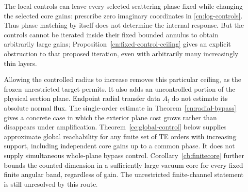 \begin{remark}
\label{cn:global-attempt}
The local controls can leave every selected scattering phase fixed
while changing the selected core gains: prescribe zero imaginary
coordinates in \eqref{cn:log-controls}.  Thus phase matching by itself
does not determine the internal response.  But the controls cannot
be iterated inside their fixed bounded annulus to obtain arbitrarily
large gains; Proposition~\ref{cn:fixed-control-ceiling} gives an
explicit obstruction to that proposed iteration, even with
arbitrarily many increasingly thin layers.

Allowing the controlled radius to increase removes this particular
ceiling, as the frozen unrestricted target permits.  It also adds an
uncontrolled portion of the physical section plane.  Endpoint radial
transfer data $A_l$ do not estimate its absolute normal flux.  The
single-order estimate in Theorem~\ref{cn:radial-bypass} gives a
concrete case in which the exterior plane cost grows rather than
disappears under amplification. Theorem~\ref{cc:global-control} below
supplies approximate global reachability for any finite set of TE
orders with increasing support, including independent core gains up
to a common phase. It does not supply simultaneous whole-plane bypass
control. Corollary~\ref{cb:finitecore} further bounds the counted
dimension in a sufficiently large vacuum core for every fixed finite
angular band, regardless of gain. The unrestricted finite-channel
statement is still unresolved by this route.
\end{remark}
